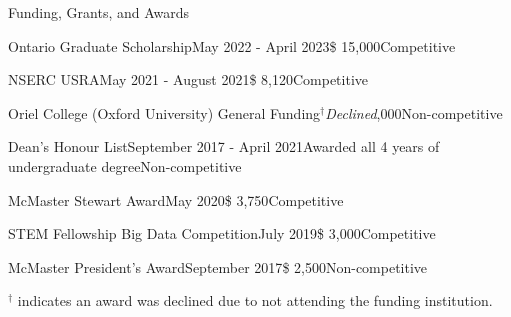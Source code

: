 \begin{rSection}{Funding, Grants, and Awards} 

\begin{aSubsection}{Ontario Graduate Scholarship}{May 2022 - April 2023}{\$ 15,000}{Competitive}
\end{aSubsection}

\begin{aSubsection}{NSERC USRA}{May 2021 - August 2021}{\$ 8,120}{Competitive}
\end{aSubsection}

\begin{aSubsection}{Oriel College (Oxford University) General Funding}{$^\dagger$\emph{Declined}}{,000}{Non-competitive}
\end{aSubsection}

\begin{aSubsection}{Dean's Honour List}{September 2017 - April 2021}{Awarded all 4 years of undergraduate degree}{Non-competitive}
\end{aSubsection}


\begin{aSubsection}{McMaster Stewart Award}{May 2020}{\$ 3,750}{Competitive}
\end{aSubsection}


\begin{aSubsection}{STEM Fellowship Big Data Competition}{July 2019}{\$ 3,000}{Competitive}
\end{aSubsection}

\begin{aSubsection}{McMaster President's Award}{September 2017}{\$ 2,500}{Non-competitive}
\end{aSubsection}

\smallskip
$^\dagger$ indicates an award was declined due to not attending the funding institution.

\end{rSection}

